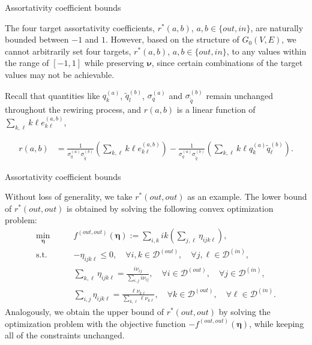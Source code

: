 \documentclass[xcolor=dvipsnames, compress, 10pt]{beamer}
\theoremstyle{remark}
\newcommand{\tq}{\tilde{q}}
\begin{document}

\begin{frame}{Assortativity coefficient bounds}

The four target assortativity coefficients, $r^*(a, b)$, 
$a, b \in \{out, in\}$, are naturally bounded
between $-1$ and $1$. 
However, based on the structure of $G_0(V, E)$, 
we cannot arbitrarily set four targets, $r^*(a, b)$, $a, b \in 
\{out, in\}$, to any values within the range of $[-1, 1]$ while 
preserving $\bm{\nu}$, since certain combinations of the target values 
may not be achievable. 

\vspace{0.2cm}

Recall that quantities like $q_k^{(a)}$, $\tq_l^{(b)}$, 
$\sigma_q^{(a)}$ and $\sigma_{\tq}^{(b)}$ 
remain unchanged throughout the rewiring process, and
$r(a, b)$ is a linear function of 
$\sum_{k, \ell} k\ell e^{\left(a, b\right)}_{k\ell}$,

\begin{align*}
	r(a, b) &= \frac{1}{\sigma_q^{(a)} \sigma_{\tq}^{(b)}} 
		\left(\sum_{k,\ell} k\ell e^{(a,b)}_{k\ell}\right) - 
	\frac{1}{\sigma_q^{(a)} \sigma_{\tq}^{(b)}} 
		\left(\sum_{k,\ell} k\ell q_k^{(a)} \tq_\ell^{(b)}\right).
\end{align*}

\end{frame}



\begin{frame}{Assortativity coefficient bounds}

Without loss of generality, we take 
$r^*(out, out)$ as an example. The lower bound of $r^*(out, out)$ is obtained
by solving the following convex optimization problem:
\begin{align*}
	\min_{\bm{\eta}} \qquad &
	f^{(out,out)}(\bm{\eta}) := \sum_{i, k}ik 
	\left(\sum_{j, \ell} \eta_{ijk\ell}\right),
	\\ \textrm{s.t.} \qquad & -\eta_{ijk\ell} \le 0, 
	\quad \forall i,k \in \mathcal{D}^{(out)}, 
	\quad \forall j,\ell \in \mathcal{D}^{(in)}, 
	\\ &\sum_{k, \ell} \eta_{ijk\ell} = 
	\frac{i \nu_{ij}}{\sum_{i, j} i \nu_{ij}},
	\quad \forall i \in \mathcal{D}^{(out)}, 
	\quad \forall j \in \mathcal{D}^{(in)},
	\\ &\sum_{i, j} \eta_{ijk\ell} = 
	\frac{\ell \nu_{k\ell}}{\sum_{k, \ell} \ell \nu_{k\ell}},
	\quad \forall k \in \mathcal{D}^{(out)}, 
	\quad \forall \ell \in \mathcal{D}^{(in)}.
\end{align*}
Analogously, we obtain the upper bound of $r^{*}(out, out)$ by 
solving the optimization problem with the objective function 
$-f^{(out, out)}(\bm{\eta})$, while keeping all of the
constraints unchanged.
	
	
\end{frame}
\end{document}
